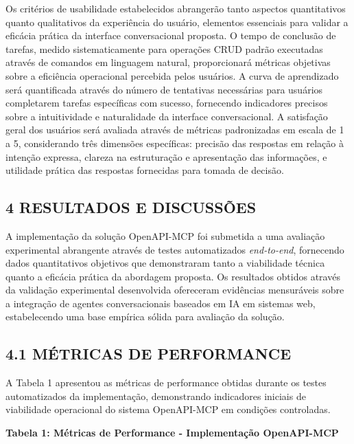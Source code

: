 \documentclass[
]{article}
\begin{document}
Os critérios de usabilidade estabelecidos abrangerão tanto aspectos
quantitativos quanto qualitativos da experiência do usuário, elementos
essenciais para validar a eficácia prática da interface conversacional
proposta. O tempo de conclusão de tarefas, medido sistematicamente para
operações CRUD padrão executadas através de comandos em linguagem
natural, proporcionará métricas objetivas sobre a eficiência operacional
percebida pelos usuários. A curva de aprendizado será quantificada
através do número de tentativas necessárias para usuários completarem
tarefas específicas com sucesso, fornecendo indicadores precisos sobre a
intuitividade e naturalidade da interface conversacional. A satisfação
geral dos usuários será avaliada através de métricas padronizadas em
escala de 1 a 5, considerando três dimensões específicas: precisão das
respostas em relação à intenção expressa, clareza na estruturação e
apresentação das informações, e utilidade prática das respostas
fornecidas para tomada de decisão.

\subsection{4 RESULTADOS E DISCUSSÕES}\label{resultados-e-discussuxf5es}

A implementação da solução OpenAPI-MCP foi submetida a uma avaliação
experimental abrangente através de testes automatizados
\emph{end-to-end}, fornecendo dados quantitativos objetivos que
demonstraram tanto a viabilidade técnica quanto a eficácia prática da
abordagem proposta. Os resultados obtidos através da validação
experimental desenvolvida ofereceram evidências mensuráveis sobre a
integração de agentes conversacionais baseados em IA em sistemas web,
estabelecendo uma base empírica sólida para avaliação da solução.

\subsection{4.1 MÉTRICAS DE
PERFORMANCE}\label{muxe9tricas-de-performance}

A Tabela 1 apresentou as métricas de performance obtidas durante os
testes automatizados da implementação, demonstrando indicadores iniciais
de viabilidade operacional do sistema OpenAPI-MCP em condições
controladas.

\textbf{Tabela 1: Métricas de Performance - Implementação OpenAPI-MCP}
\end{document}
